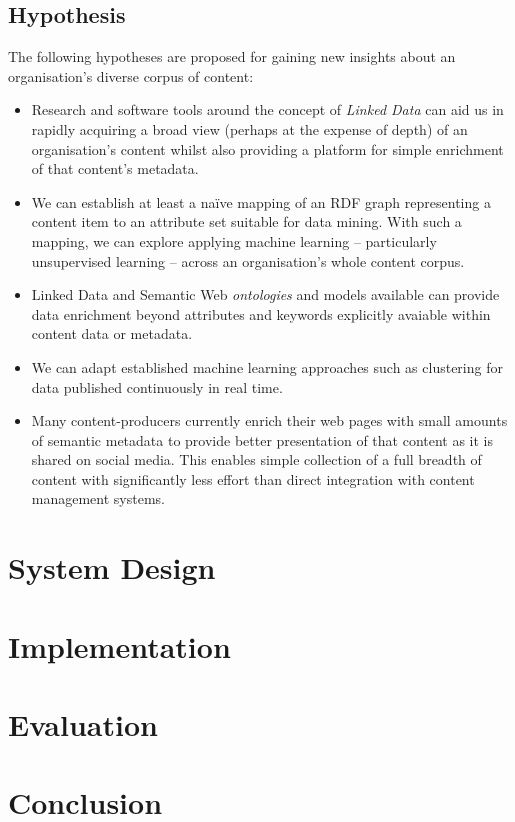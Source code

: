 \documentclass[10pt,a4paper]{report}
\begin{document}
\section{Hypothesis}

The following hypotheses are proposed for gaining new insights about an
organisation's diverse corpus of content:

\begin{itemize}

\item Research and software tools around the concept of \emph{Linked Data} can
aid us in rapidly acquiring a broad view (perhaps at the expense of depth) of an
organisation's content whilst also providing a platform for simple enrichment of
that content's metadata.

\item We can establish at least a na\"ive mapping of an RDF graph representing a
content item to an attribute set suitable for data mining. With such a mapping,
we can explore applying machine learning -- particularly unsupervised learning
-- across an organisation's whole content corpus.

\item Linked Data and Semantic Web \emph{ontologies} and models available can
provide data enrichment beyond attributes and keywords explicitly avaiable
within content data or metadata.

\item We can adapt established machine learning approaches such as clustering
for data published continuously in real time.

\item Many content-producers currently enrich their web pages with small
amounts of semantic metadata to provide better presentation of that content
as it is shared on social media. This enables simple collection of a full
breadth of content with significantly less effort than direct integration
with content management systems.

\end{itemize}

\chapter{System Design}
\chapter{Implementation}
\chapter{Evaluation}
\chapter{Conclusion}
\end{document}
